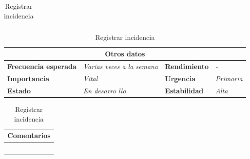 \documentclass[12pt,spanish]{article}
\begin{document}
\begin{table}[H]
\begin{tabular}{|m{5pt}|m{7.33cm}|m{5pt}|m{7.33cm}|}
		
	\end{tabular}
	
	\vspace{0.5cm}
	
	\begin{tabular}{|m{3.75cm}|m{3.75cm}|m{3.75cm}|m{3.8cm}|}
		\hline
		\multicolumn{4}{|c|}{\textbf{Otros datos}} \\
		\hline
		\textbf{Frecuencia esperada} & \textit{Varias veces a la semana} & \textbf{Rendimiento} & \textit{-} \\
		\hline
		\textbf{Importancia} & \textit{Vital} & \textbf{Urgencia} & \textit{Primaria} \\
		\hline
		\textbf{Estado} & \textit{En desarro
		llo} & \textbf{Estabilidad} & \textit{Alta} \\
		\hline
	\end{tabular}
	
	\vspace{1cm}
	
	\begin{tabular}{|m{16.2cm}|}
		\hline
		\textbf{Comentarios} \\
		\hline
		\textit{-} \\
		\hline
	\end{tabular}
	
	\caption{Registrar incidencia}
	
\end{table}
\end{document}
